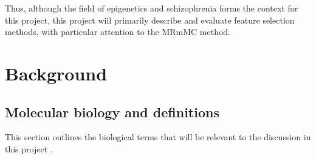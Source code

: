 \documentclass[12pt, twoside, a4paper]{report}
\begin{document}
Thus, although the field of epigenetics and schizophrenia forms the context for this project, this project will primarily describe and evaluate feature selection methods, with particular attention to the MRmMC method.



\chapter{Background}






\section{Molecular biology and definitions} \label{bg:bio}
This section outlines the biological terms that will be relevant to the discussion in this project \cite{RefWorks:106, RefWorks:108, RefWorks:110, RefWorks:111}.
\end{document}
